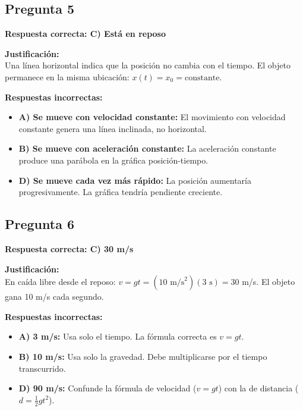 \begin{respuestabox}
\subsection{Pregunta 5}
\textcolor{verdecorrecto}{\textbf{Respuesta correcta: C) Está en reposo}}

\textbf{Justificación:}\\
Una línea horizontal indica que la posición no cambia con el tiempo. El objeto permanece en la misma ubicación: $x(t) = x_0 = \text{constante}$.

\textbf{Respuestas incorrectas:}
\begin{itemize}
    \item \textbf{A) Se mueve con velocidad constante:} El movimiento con velocidad constante genera una línea inclinada, no horizontal.
    \item \textbf{B) Se mueve con aceleración constante:} La aceleración constante produce una parábola en la gráfica posición-tiempo.
    \item \textbf{D) Se mueve cada vez más rápido:} La posición aumentaría progresivamente. La gráfica tendría pendiente creciente.
\end{itemize}
\end{respuestabox}

\begin{respuestabox}
\subsection{Pregunta 6}
\textcolor{verdecorrecto}{\textbf{Respuesta correcta: C) 30 m/s}}

\textbf{Justificación:}\\
En caída libre desde el reposo: $v = gt = (10 \text{ m/s}^2)(3 \text{ s}) = 30$ m/s. El objeto gana 10 m/s cada segundo.

\textbf{Respuestas incorrectas:}
\begin{itemize}
    \item \textbf{A) 3 m/s:} Usa solo el tiempo. La fórmula correcta es $v = gt$.
    \item \textbf{B) 10 m/s:} Usa solo la gravedad. Debe multiplicarse por el tiempo transcurrido.
    \item \textbf{D) 90 m/s:} Confunde la fórmula de velocidad ($v = gt$) con la de distancia ($d = \frac{1}{2}gt^2$).
\end{itemize}
\end{respuestabox}


